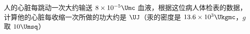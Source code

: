 \documentclass[\gkver]{gaokaozhenti}
\begin{document}
\begin{enumerate}
人的心脏每跳动一次大约输送 $8\times10^{-5}\Umc$ 血液，根据这位病人体检表的数据，计算他的心脏每收缩一次所做的功大约是 $\UJ$（汞的密度是 $13.6\times10^{3}\Ukgmc$，$g$ 取 $10\Umsq$）



\end{enumerate}
\end{document}
